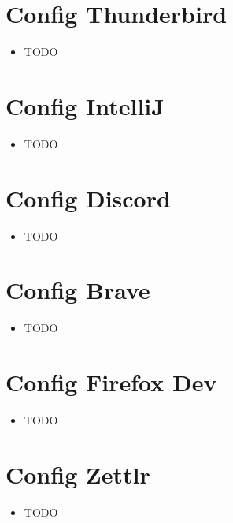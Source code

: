 \documentclass[12pt]{article}
\begin{document}
    \section{Config Thunderbird}\label{sec:config-thunderbird}
        \begin{itemize}
            \item TODO
        \end{itemize}


    \section{Config IntelliJ}\label{sec:config-intellij}
        \begin{itemize}
            \item TODO
        \end{itemize}

    \section{Config Discord}\label{sec:config-discord}
        \begin{itemize}
            \item TODO
        \end{itemize}

    \section{Config Brave}\label{sec:config-brave}
        \begin{itemize}
            \item TODO
        \end{itemize}

    \section{Config Firefox Dev}\label{sec:config-firefox-dev}
        \begin{itemize}
            \item TODO
        \end{itemize}

    \section{Config Zettlr}\label{sec:config-zettlr}
        \begin{itemize}
            \item TODO
        \end{itemize}
\end{document}
